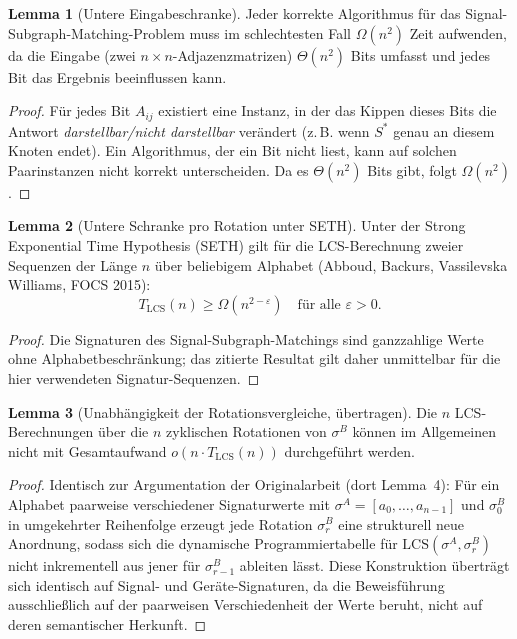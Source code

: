 ﻿\documentclass[a4paper,12pt]{article}
\theoremstyle{definition}
\newtheorem{lemma}{Lemma}
\begin{document}
\begin{lemma}[Untere Eingabeschranke]
\label{lem:eingabe}
	Jeder korrekte Algorithmus für das Signal-Subgraph-Matching-Problem muss im schlechtesten Fall $\Omega(n^2)$ Zeit aufwenden, da die Eingabe (zwei $n \times n$-Adjazenzmatrizen) $\Theta(n^2)$ Bits umfasst und jedes Bit das Ergebnis beeinflussen kann.
\end{lemma}
\begin{proof}
	Für jedes Bit $A_{ij}$ existiert eine Instanz, in der das Kippen dieses Bits die Antwort \emph{darstellbar/nicht darstellbar} verändert (z.\,B. wenn $S^\ast$ genau an diesem Knoten endet). Ein Algorithmus, der ein Bit nicht liest, kann auf solchen Paarinstanzen nicht korrekt unterscheiden. Da es $\Theta(n^2)$ Bits gibt, folgt $\Omega(n^2)$.
\end{proof}

\begin{lemma}[Untere Schranke pro Rotation unter SETH]
\label{lem:lcs}
	Unter der Strong Exponential Time Hypothesis (SETH) gilt für die LCS-Berechnung zweier Sequenzen der Länge $n$ über beliebigem Alphabet (Abboud, Backurs, Vassilevska Williams, FOCS 2015):
	\[
	T_{\mathrm{LCS}}(n) \geq \Omega(n^{2-\varepsilon}) \quad \text{für alle } \varepsilon > 0.
	\]
\end{lemma}
\begin{proof}
	Die Signaturen des Signal-Subgraph-Matchings sind ganzzahlige Werte ohne Alphabetbeschränkung; das zitierte Resultat gilt daher unmittelbar für die hier verwendeten Signatur-Sequenzen.
\end{proof}

\begin{lemma}[Unabhängigkeit der Rotationsvergleiche, übertragen]
\label{lem:unabhaengigkeit}
	Die $n$ LCS-Berechnungen über die $n$ zyklischen Rotationen von $\sigma^B$ können im Allgemeinen nicht mit Gesamtaufwand $o(n \cdot T_{\mathrm{LCS}}(n))$ durchgeführt werden.
\end{lemma}
\begin{proof}
	Identisch zur Argumentation der Originalarbeit (dort Lemma~4): Für ein Alphabet paarweise verschiedener Signaturwerte mit $\sigma^A = [a_0,\ldots,a_{n-1}]$ und $\sigma^B_0$ in umgekehrter Reihenfolge erzeugt jede Rotation $\sigma^B_r$ eine strukturell neue Anordnung, sodass sich die dynamische Programmiertabelle für $\mathrm{LCS}(\sigma^A, \sigma^B_r)$ nicht inkrementell aus jener für $\sigma^B_{r-1}$ ableiten lässt. Diese Konstruktion überträgt sich identisch auf Signal- und Geräte-Signaturen, da die Beweisführung ausschließlich auf der paarweisen Verschiedenheit der Werte beruht, nicht auf deren semantischer Herkunft.
\end{proof}
\end{document}

